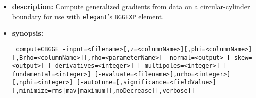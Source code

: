 \documentclass[11pt]{article}
\begin{document}
\begin{itemize}
\item {\bf description:}  Compute generalized gradients \cite{Venturini-NIMA427-387} from data on a circular-cylinder
boundary for use with {\tt elegant}'s \verb|BGGEXP| element.

\item {\bf synopsis:}
\begin{flushleft}{\tt
computeCBGGE -input=<filename>[,z=<columnName>][,phi=<columnName>][,Brho=<columnName>][,rho=<parameterName>]
              -normal=<output> [-skew=<output>]
              [-derivatives=<integer>] [-multipoles=<integer>] [-fundamental=<integer>]
              [-evaluate=<filename>[,nrho=<integer>][,nphi=<integer>]
              [-autotune=[,significance=<fieldValue>][,minimize={rms|mav|maximum}][,noDecrease][,verbose]]
}\end{flushleft}


\end{itemize}
\end{document}
